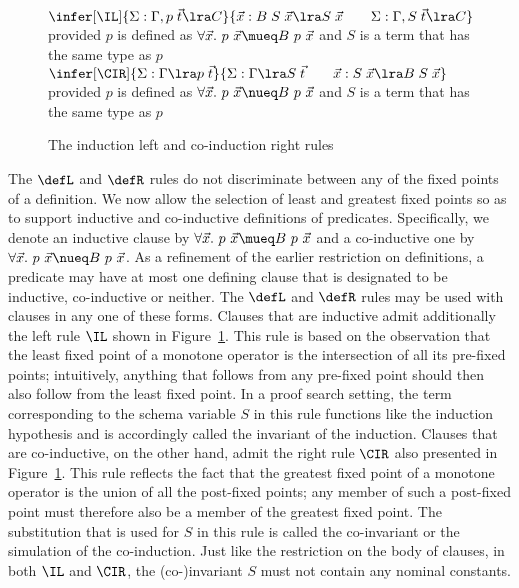 \begin{figure}[t]
\begin{center}
$\infer[\IL]
      {\Sigma : \Gamma, p\; \vec{t} \lra C}
      {\vec{x} : B\; S\; \vec{x} \lra S\; \vec{x} \qquad
       \Sigma : \Gamma, S\; \vec{t} \lra C}$\\[5pt]
provided $p$ is defined as $\forall  \vec{x}.~ p\  \vec{x}
\mueq  B\ p\  \vec{x}$ and $S$ is a term that has the same type as $p$
      \\[15pt]
$\infer[\CIR]
      {\Sigma : \Gamma \lra p\; \vec{t}}
      {\Sigma : \Gamma \lra S\; \vec{t} \qquad
       \vec{x} : S\; \vec{x} \lra B\; S\; \vec{x}}
$\\[5pt]
provided $p$ is defined as $\forall  \vec{x}.~ p\  \vec{x}
\nueq  B\ p\  \vec{x}$ and $S$ is a term that has the same type as $p$
\end{center}
\caption{The induction left and co-induction right rules}
\label{fig:indandcoind}
\end{figure}

The $\defL$ and $\defR$ rules do not discriminate between any of the
fixed points of a definition.
We now allow the selection of least and greatest fixed points so as to
support inductive and co-inductive definitions of predicates.
Specifically, we denote an inductive clause by $\forall \vec{x}.~ p\
\vec{x} \mueq B\ p\ \vec{x}$ and a co-inductive one by $\forall
\vec{x}.~ p\ \vec{x} \nueq B\ p\ \vec{x}$. As a refinement of the
earlier restriction on definitions, a predicate may have at most one
defining clause that is designated to be inductive, co-inductive or
neither. The $\defL$ and $\defR$ rules may be used with clauses in any
one of these forms. Clauses that are inductive admit additionally the
left rule $\IL$ shown in Figure~\ref{fig:indandcoind}. This rule is
based on the observation that the least fixed point of a monotone
operator is the intersection of all its pre-fixed points; intuitively,
anything that follows from any pre-fixed point should then also follow
from the least fixed point. In a proof search setting, the term
corresponding to the schema variable $S$ in this rule functions like
the induction hypothesis and is accordingly called the invariant of
the induction. Clauses that are co-inductive, on the other hand, admit
the right rule $\CIR$ also presented in Figure~\ref{fig:indandcoind}.
This rule reflects the fact that the greatest fixed point of a
monotone operator is the union of all the post-fixed points; any
member of such a post-fixed point must therefore also be a member of
the greatest fixed point. The substitution that is used for $S$ in
this rule is called the co-invariant or the simulation of the
co-induction. Just like the restriction on the body of clauses, in
both $\IL$ and $\CIR$, the (co-)invariant $S$ must not contain any
nominal constants.

